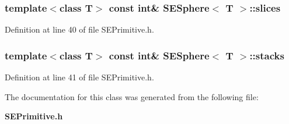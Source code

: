 \subsubsection[{slices}]{\setlength{\rightskip}{0pt plus 5cm}template$<$class T$>$ const int\& {\bf S\+E\+Sphere}$<$ T $>$\+::slices}\label{class_s_e_sphere_a57a4326169e9d93cbaae3af22bbea09e}


Definition at line 40 of file S\+E\+Primitive.\+h.

\subsubsection[{stacks}]{\setlength{\rightskip}{0pt plus 5cm}template$<$class T$>$ const int\& {\bf S\+E\+Sphere}$<$ T $>$\+::stacks}\label{class_s_e_sphere_a1e1aa7c3af138154205e49b96dfab285}


Definition at line 41 of file S\+E\+Primitive.\+h.



The documentation for this class was generated from the following file\+:\begin{DoxyCompactItemize}
\item 
{\bf S\+E\+Primitive.\+h}\end{DoxyCompactItemize}
